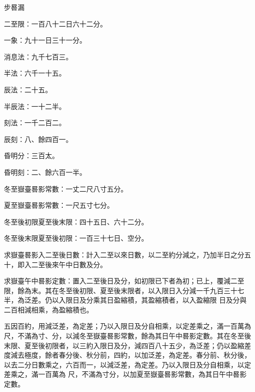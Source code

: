 \begin{pinyinscope}
 步晷漏



 二至限：一百八十二日六十二分。



 一象：九十一日三十一分。



 消息法：九千七百三。



 半法：六千一十五。



 辰法：二十五。



 半辰法：一十二半。



 刻法：一千二百二。



 辰刻：八、餘四百一。



 昏明分：三百太。



 昏明刻：二、餘六百一半。



 冬至嶽臺晷影常數：一丈二尺八寸五分。



 夏至嶽臺晷影常數：一尺五寸七分。



 冬至後初限夏至後末限：四十五日、六十二分。



 冬至後末限夏至後初限：一百三十七日、空分。



 求嶽臺晷影入二至後日數：計入二至以來日數，以二至約分減之，乃加半日之分五十，即入二至後來午中日數及分。



 求嶽臺午中晷影定數：置入二至後日及分，如初限已下者為初；已上，覆減二至限，餘為末。其在冬至後初限、夏至後末限者，以入限日入分減一千九百三十七半，為泛差。仍以入限日及分乘其日盈縮積，其盈縮積者，以入盈縮限
 日及分與二百相減相乘，為盈縮積也。



 五因百約，用減泛差，為定差；乃以入限日及分自相乘，以定差乘之，滿一百萬為尺，不滿為寸、分，以減冬至嶽臺晷影常數，餘為其日午中晷影定數。其在冬至後末限、夏至後初限者，以三約入限日及分，減四百八十五少，為泛差；仍以盈縮差度減去極度，餘者春分後、秋分前，四約，以加泛差，為定差。春分前、秋分後，以去二分日數乘之，六百而一，以減泛差，為定差。乃以入限日及分自相乘，以定差乘之，滿一百萬為
 尺，不滿為寸分，以加夏至嶽臺晷影常數，為其日午中晷影定數。




\end{pinyinscope}
